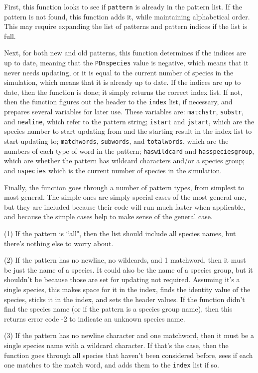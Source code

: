 \documentclass {scrbook}
\newcommand {\ttt} {\texttt}
\begin{document}
\begin{description}
First, this function looks to see if \ttt{pattern} is already in the pattern list. If the pattern is not found, this function adds it, while maintaining alphabetical order. This may require expanding the list of patterns and pattern indices if the list is full.

Next, for both new and old patterns, this function determines if the indices are up to date, meaning that the \ttt{PDnspecies} value is negative, which means that it never needs updating, or it is equal to the current number of species in the simulation, which means that it is already up to date. If the indices are up to date, then the function is done; it simply returns the correct index list. If not, then the function figures out the header to the \ttt{index} list, if necessary, and prepares several variables for later use. These variables are: \ttt{matchstr}, \ttt{substr}, and \ttt{newline}, which refer to the pattern string; \ttt{istart} and \ttt{jstart}, which are the species number to start updating from and the starting result in the index list to start updating to; \ttt{matchwords}, \ttt{subwords}, and \ttt{totalwords}, which are the numbers of each type of word in the pattern; \ttt{haswildcard} and \ttt{hasspeciesgroup}, which are whether the pattern has wildcard characters and/or a species group; and \ttt{nspecies} which is the current number of species in the simulation.

Finally, the function goes through a number of pattern types, from simplest to most general. The simple ones are simply special cases of the most general one, but they are included because their code will run much faster when applicable, and because the simple cases help to make sense of the general case.

(1) If the pattern is ``all", then the list should include all species names, but there's nothing else to worry about.

(2) If the pattern has no newline, no wildcards, and 1 matchword, then it must be just the name of a species. It could also be the name of a species group, but it shouldn't be because those are set for updating not required. Assuming it's a single species, this makes space for it in the index, finds the identity value of the species, sticks it in the index, and sets the header values. If the function didn't find the species name (or if the pattern is a species group name), then this returns error code -2 to indicate an unknown species name.

(3) If the pattern has no newline character and one matchword, then it must be a single species name with a wildcard character. If that's the case, then the function goes through all species that haven't been considered before, sees if each one matches to the match word, and adds them to the \ttt{index} list if so.


\end{description}
\end{document}
